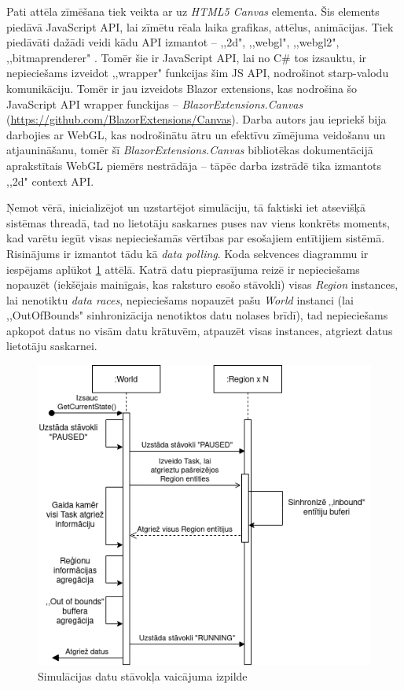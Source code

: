 Pati attēla zīmēšana tiek veikta ar uz \emph{HTML5 Canvas} elementa\cite{html5:canvas}.
Šis elements piedāvā JavaScript API, lai zīmētu rēala laika grafikas, attēlus, animācijas.
Tiek piedāvāti dažādi veidi kādu API izmantot -- ,,2d", ,,webgl", ,,webgl2",
,,bitmaprenderer" \cite{html5:canvas-contexts}. Tomēr šie ir JavaScript API, lai
no C\# tos izsauktu, ir nepieciešams izveidot ,,wrapper" funkcijas šim JS API,
nodrošinot starp-valodu komunikāciju. Tomēr ir jau izveidots Blazor extensions,
kas nodrošina šo JavaScript API wrapper funckijas -- \emph{BlazorExtensions.Canvas}
(\url{https://github.com/BlazorExtensions/Canvas}).
Darba autors jau iepriekš bija darbojies ar WebGL, kas nodrošinātu ātru un efektīvu
zīmējuma veidošanu un atjaunināšanu, tomēr šī \emph{BlazorExtensions.Canvas} bibliotēkas
dokumentācijā aprakstītais WebGL piemērs nestrādāja -- tāpēc darba izstrādē tika
izmantots ,,2d" context API.

Ņemot vērā, inicializējot un uzstartējot simulāciju, tā faktiski iet atsevišķā
sistēmas threadā, tad no lietotāju saskarnes puses nav viens konkrēts moments, kad
varētu iegūt visas nepieciešamās vērtības par esošajiem entītijiem sistēmā. Risinājums
ir izmantot tādu kā \emph{data polling}\cite{progr:data-polling}. Koda sekvences
diagrammu ir iespējams aplūkot \ref{img:squance-diagram-get-status} attēlā. Katrā
datu pieprasījuma reizē ir nepieciešams nopauzēt (iekšējais mainīgais, kas raksturo esošo stāvokli) visas \emph{Region} instances,
lai nenotiktu \emph{data races}, nepieciešams nopauzēt pašu \emph{World} instanci (lai
,,OutOfBounds" sinhronizācija nenotiktos datu nolases brīdī), tad nepieciešams apkopot
datus no visām datu krātuvēm, atpauzēt visas instances, atgriezt datus lietotāju saskarnei.

\begin{figure}[H]
	\centering
	\includegraphics[scale=0.7]{images/DiseaseCore-GetData.png}
	\caption{Simulācijas datu stāvokļa vaicājuma izpilde}
	\label{img:squance-diagram-get-status}
\end{figure}

